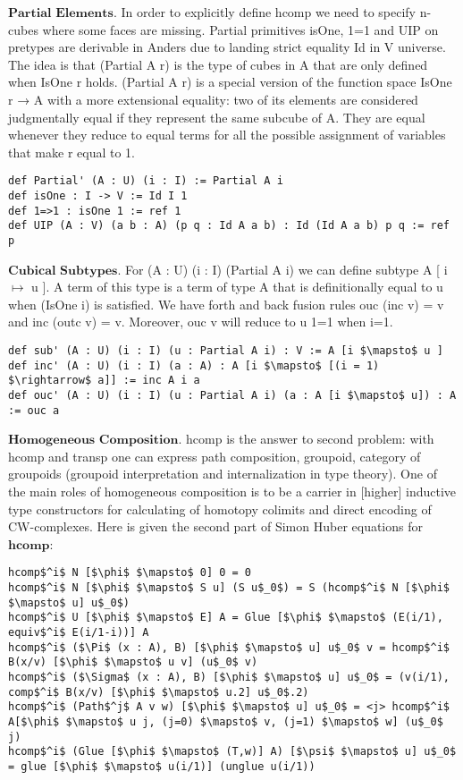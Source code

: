 \documentclass{article}
\begin{document}
\newpage
$\textbf{Partial\ Elements}$. In order to explicitly define hcomp we need to specify
n-cubes where some faces are missing. Partial primitives isOne, 1=1 and UIP on pretypes
are derivable in Anders due to landing strict equality Id in V universe. The idea is
that (Partial A r) is the type of cubes in A that are only defined when IsOne r holds.
(Partial A r) is a special version of the function space IsOne r → A with a more
extensional equality: two of its elements are considered judgmentally equal if
they represent the same subcube of A. They are equal whenever they reduce to
equal terms for all the possible assignment of variables that make r equal to 1.

\begin{lstlisting}[mathescape=true]
def Partial' (A : U) (i : I) := Partial A i
def isOne : I -> V := Id I 1
def 1=>1 : isOne 1 := ref 1
def UIP (A : V) (a b : A) (p q : Id A a b) : Id (Id A a b) p q := ref p
\end{lstlisting}

$\textbf{Cubical\ Subtypes}$. For (A : U) (i : I) (Partial A i) we can define
subtype A [ i $\mapsto$ u ]. A term of this type is a term of type A that is
definitionally equal to u when (IsOne i) is satisfied. We have forth and back
fusion rules ouc (inc v) = v and inc (outc v) = v. Moreover, ouc v will reduce to u 1=1 when i=1.

\begin{lstlisting}[mathescape=true]
def sub' (A : U) (i : I) (u : Partial A i) : V := A [i $\mapsto$ u ]
def inc' (A : U) (i : I) (a : A) : A [i $\mapsto$ [(i = 1) $\rightarrow$ a]] := inc A i a
def ouc' (A : U) (i : I) (u : Partial A i) (a : A [i $\mapsto$ u]) : A := ouc a
\end{lstlisting}

$\textbf{Homogeneous\ Composition}$. hcomp is the answer to second problem: with hcomp and transp
one can express path composition, groupoid, category of groupoids (groupoid interpretation and
internalization in type theory). One of the main roles of homogeneous composition is to be a
carrier in [higher] inductive type constructors for calculating of homotopy colimits and direct
encoding of CW-complexes. Here is given the second part of Simon Huber equations \cite{Huber} for $\textbf{hcomp}$:

\begin{lstlisting}[mathescape=true]
hcomp$^i$ N [$\phi$ $\mapsto$ 0] 0 = 0
hcomp$^i$ N [$\phi$ $\mapsto$ S u] (S u$_0$) = S (hcomp$^i$ N [$\phi$ $\mapsto$ u] u$_0$)
hcomp$^i$ U [$\phi$ $\mapsto$ E] A = Glue [$\phi$ $\mapsto$ (E(i/1), equiv$^i$ E(i/1-i))] A
hcomp$^i$ ($\Pi$ (x : A), B) [$\phi$ $\mapsto$ u] u$_0$ v = hcomp$^i$ B(x/v) [$\phi$ $\mapsto$ u v] (u$_0$ v)
hcomp$^i$ ($\Sigma$ (x : A), B) [$\phi$ $\mapsto$ u] u$_0$ = (v(i/1), comp$^i$ B(x/v) [$\phi$ $\mapsto$ u.2] u$_0$.2)
hcomp$^i$ (Path$^j$ A v w) [$\phi$ $\mapsto$ u] u$_0$ = <j> hcomp$^i$ A[$\phi$ $\mapsto$ u j, (j=0) $\mapsto$ v, (j=1) $\mapsto$ w] (u$_0$ j)
hcomp$^i$ (Glue [$\phi$ $\mapsto$ (T,w)] A) [$\psi$ $\mapsto$ u] u$_0$ = glue [$\phi$ $\mapsto$ u(i/1)] (unglue u(i/1))
\end{lstlisting}
\end{document}
